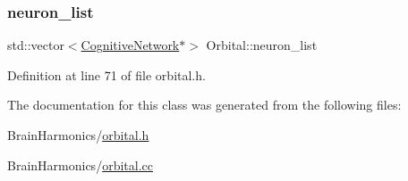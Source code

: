 \subsubsection{\texorpdfstring{neuron\+\_\+list}{neuron\_list}}
{\footnotesize\ttfamily std\+::vector$<$\hyperlink{class_cognitive_network}{Cognitive\+Network}$\ast$$>$ Orbital\+::neuron\+\_\+list\hspace{0.3cm}{\ttfamily [protected]}}



Definition at line 71 of file orbital.\+h.



The documentation for this class was generated from the following files\+:\begin{DoxyCompactItemize}
\item 
Brain\+Harmonics/\hyperlink{orbital_8h}{orbital.\+h}\item 
Brain\+Harmonics/\hyperlink{orbital_8cc}{orbital.\+cc}\end{DoxyCompactItemize}
